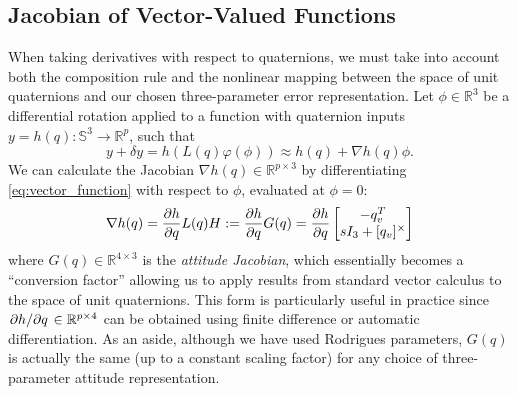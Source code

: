 \documentclass{svproc}
\newcommand{\R}{\mathbb{R}}
\newcommand{\Q}{\mathbb{S}^3}
\newcommand{\skewmat}[1]{[#1]^\times}
\begin{document}
    \subsection{Jacobian of Vector-Valued Functions}
        When taking derivatives with respect to quaternions, we must take into account both the composition rule and the nonlinear
        mapping between the space of unit quaternions and our chosen three-parameter error representation. 
        Let $\phi \in \R^3$ be a differential rotation applied to a function with quaternion inputs $y = h(q): \Q \to \R^p$, such that
        \begin{equation} \label{eq:vector_function}
            y + \delta y = h(L(q) \varphi(\phi)) \approx h(q) +  \nabla h(q) \phi.
        \end{equation}
        We can calculate the Jacobian $\nabla h(q) \in \R^{p \times 3}$ by differentiating \eqref{eq:vector_function} with respect to $\phi$, evaluated at $\phi = 0$:
        \begin{equation} \label{eq:quat_gradient}
            \nabla h(q) = \pdv{h}{q} L(q) H := \pdv{h}{q} G(q) = \pdv{h}{q} \begin{bmatrix} -q_v^T \\ sI_3 + \skewmat{q_v} \end{bmatrix}
        \end{equation}
        where $G(q) \in \R^{4 \times 3}$ is the \textit{attitude Jacobian}, which essentially becomes a ``conversion factor'' allowing us to apply results from standard vector calculus to the space of unit quaternions. This form is particularly useful in practice since $\pdv*{h}{q} \in \R^{p \times 4}$ can be obtained using finite difference or automatic differentiation.
        As an aside, although we have used Rodrigues parameters, $G(q)$ is actually the same (up to a constant scaling factor) for any choice of three-parameter attitude representation.
        
\end{document}
